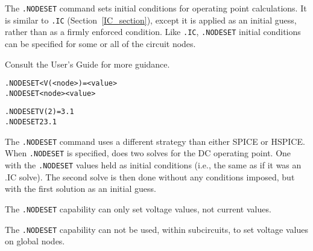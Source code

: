 


\label{NODESET_section}

The \texttt{.NODESET} command sets initial conditions for operating point
calculations.  It is similar to \texttt{.IC} (Section~\ref{IC_section}), except 
it is applied as an initial guess, rather than as a firmly enforced
condition. Like \texttt{.IC}, \texttt{.NODESET} initial conditions can be specified
for some or all of the circuit nodes.

Consult the \Xyce{} User's Guide for more guidance.

\begin{Command}

\format
\begin{alltt}
.NODESET < V(<node>)=<value>
.NODESET <node> <value>
\end{alltt}

\examples
\begin{alltt}
.NODESET V(2)=3.1
.NODESET 2 3.1
\end{alltt}

\comments
The \Xyce{} \texttt{.NODESET} command uses a different strategy than either
SPICE or HSPICE.  When \texttt{.NODESET} is specified, \Xyce{} does two solves
for the DC operating point.  One with the \texttt{.NODESET} values held as 
initial conditions (i.e., the same as if it was an .IC solve). The second solve
is then done without any conditions imposed, but with the first solution as an
initial guess. 

The \texttt{.NODESET} capability can only set voltage values, not current values.

The \texttt{.NODESET} capability can not be used, within subcircuits, to set voltage values on global nodes.

\end{Command}

